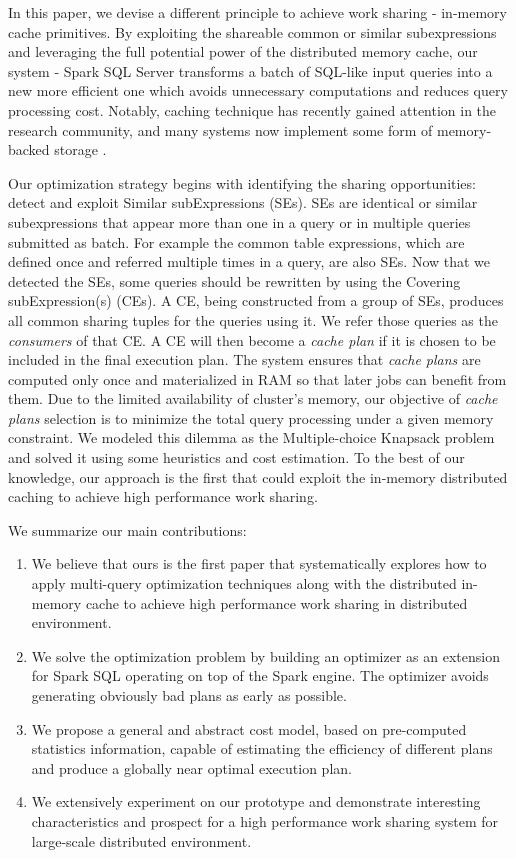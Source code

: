 In this paper, we devise a different principle to achieve work sharing - in-memory cache primitives. By exploiting the shareable common or similar subexpressions and leveraging the full potential power of the distributed memory cache, our system - Spark SQL Server transforms a batch of SQL-like input queries into a new more efficient one which avoids unnecessary computations and reduces query processing cost. Notably, caching technique has recently gained attention in the research community, and many systems now implement some form of memory-backed storage \cite{tachyon, hdfs}.

Our optimization strategy begins with identifying the sharing opportunities: detect and exploit Similar subExpressions (SEs). SEs are identical or similar subexpressions that appear more than one in a query or in multiple queries submitted as batch. For example the common table expressions, which are defined once and referred multiple times in a query, are also SEs. Now that we detected the SEs, some queries should be rewritten by using the Covering subExpression(s) (CEs). A CE, being constructed from a group of SEs, produces all common sharing tuples for the queries using it. We refer those queries as the \emph{consumers} of that CE. A CE will then become a \emph{cache plan} if it is chosen to be included in the final execution plan. The system ensures that \emph{cache plans} are computed only once and materialized in RAM so that later jobs can benefit from them. Due to the limited availability of cluster's memory, our objective of \emph{cache plans} selection is to minimize the total query processing under a given memory constraint. We modeled this dilemma as the Multiple-choice Knapsack problem and solved it using some heuristics and cost estimation. To the best of our knowledge, our approach is the first that could exploit the in-memory distributed caching to achieve high performance work sharing.

We summarize our main contributions:
\begin{enumerate}
	\item We believe that ours is the first paper that systematically explores how to apply multi-query optimization techniques along with the distributed in-memory cache to achieve high performance work sharing in distributed environment.
	\item We solve the optimization problem by building an optimizer as an extension for Spark SQL operating on top of the Spark engine. The optimizer avoids generating obviously bad plans as early as possible.
	\item We propose a general and abstract cost model, based on pre-computed statistics information, capable of estimating the efficiency of different plans and produce a globally near optimal execution plan.
	\item We extensively experiment on our prototype and demonstrate interesting characteristics and prospect for a high performance work sharing system for large-scale distributed environment.
\end{enumerate}

